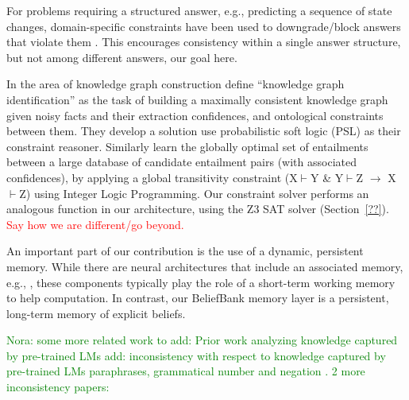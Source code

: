 \documentclass[11pt]{article}
\newcommand{\nk}[1]{\textcolor{green}{Nora: #1}}
\newcommand{\red}[1]{\textcolor{red}{#1}}
\begin{document}
For problems requiring a structured answer, e.g., predicting a sequence of
state changes, domain-specific constraints have been used to downgrade/block
answers that violate them \cite{Tandon2018ReasoningAA,Du2019BeCI}. This
encourages consistency within a single answer structure, but not among
different answers, our goal here.

In the area of knowledge graph construction
\citet{Pujara2013KnowledgeGI} define ``knowledge graph identification''
as the task of building a maximally consistent knowledge graph given noisy facts
and their extraction confidences, and ontological constraints between them.
They develop a solution use probabilistic soft logic (PSL) \cite{Broecheler2010ProbabilisticSL}
as their constraint reasoner. 
Similarly \citet{berant2010global} learn the globally
optimal set of entailments between a large database of candidate
entailment pairs (with associated confidences), by applying
a global transitivity constraint (X$\vdash$Y \& Y$\vdash$Z $\rightarrow$ X$\vdash$Z)
using Integer Logic Programming. 
Our constraint solver performs an analogous
function in our architecture, using the Z3 SAT solver (Section~\ref{??}).
\red{Say how we are different/go beyond.}

An important part of our contribution is the use of a dynamic, persistent memory.
While there are neural architectures that include an associated memory,
e.g., \cite{Henaff2017TrackingTW,Sukhbaatar2015EndToEndMN}, these components
typically play the role of a short-term working memory to help computation.
In contrast, our BeliefBank memory layer is a persistent, long-term memory of
explicit beliefs.


\nk{some more related work to add:
Prior work analyzing knowledge captured by pre-trained LMs 
add: inconsistency with respect to knowledge captured by pre-trained LMs paraphrases, grammatical number and negation \cite{Elazar2021MeasuringAI, ravichander-etal-2020-systematicity, ettinger-2020-bert, kassner-schutze-2020-negated}. 
2 more inconsistency papers: \citet{Camburu2020MakeUY}
\citep{du2019consistent}
}

\end{document}
